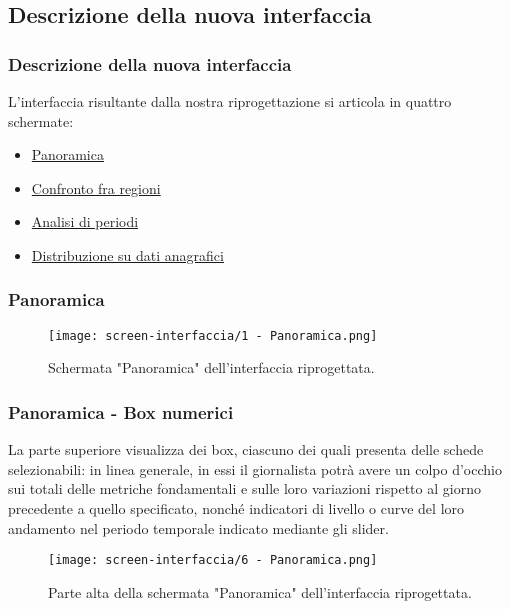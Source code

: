 \subsection{Descrizione della nuova interfaccia}
\begin{frame}
    \frametitle{Descrizione della nuova interfaccia}
    L'interfaccia risultante dalla nostra riprogettazione si articola in quattro schermate: 
    \begin{itemize}
        \item \hyperlink{panoramica}{Panoramica} 
        \item \hyperlink{confronto-regioni}{Confronto fra regioni}
        \item \hyperlink{analisi-periodi}{Analisi di periodi}
        \item \hyperlink{distribuzione}{Distribuzione su dati anagrafici}
    \end{itemize}  

\end{frame}

\begin{frame}
    \frametitle{Panoramica}
    \label{panoramica}
    \begin{figure}
        \centering
        \texttt{[image: screen-interfaccia/1 - Panoramica.png]}
        \caption{Schermata "Panoramica" dell'interfaccia riprogettata.}
    \end{figure}
    
\end{frame}

\begin{frame}
    \frametitle{Panoramica - Box numerici}
    La parte superiore visualizza dei box, ciascuno dei quali presenta delle schede selezionabili: in linea generale, in essi il giornalista potrà avere un colpo d'occhio sui totali delle metriche fondamentali e sulle loro variazioni rispetto al giorno precedente a quello specificato, nonché indicatori di livello o curve del loro andamento nel periodo temporale indicato mediante gli slider.
    \begin{figure}
        \centering
        \texttt{[image: screen-interfaccia/6 - Panoramica.png]}
        \caption{Parte alta della schermata "Panoramica" dell'interfaccia riprogettata.}
    \end{figure}

\end{frame}


